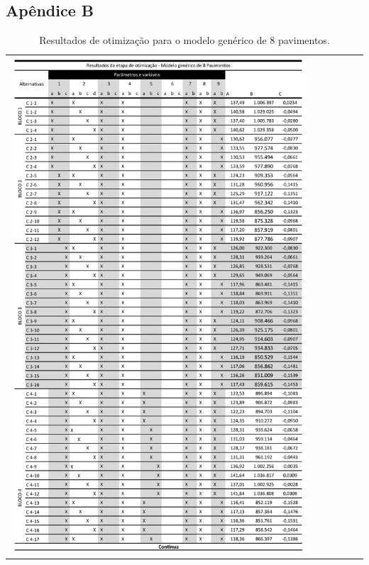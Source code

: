 \subsection{Apêndice B}
\begin{table}[H]
    \centering
    \caption{Resultados de otimização para o modelo genérico de 8 pavimentos.}
    \begin{tabular}{l}
        \includegraphics[width=0.85\textwidth]{figures/appendices/tabela01.png}
    \end{tabular}
    \label{tab:19}
\end{table}
\pagebreak
